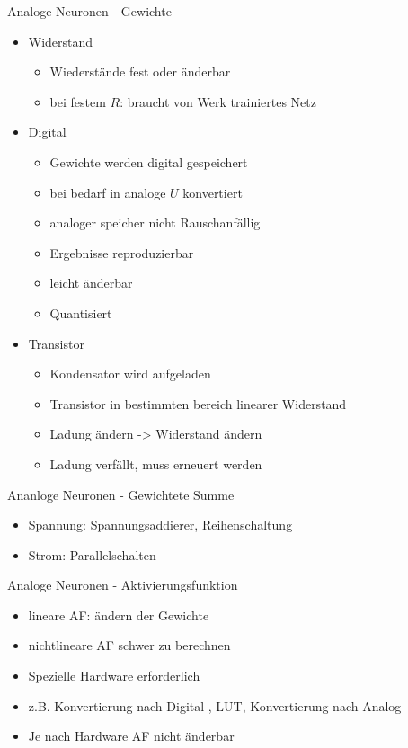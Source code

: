 \documentclass[handout]{beamer}
\begin{document}
    \begin{frame}{Analoge Neuronen - Gewichte}
        \begin{itemize}[<+->]
            \item Widerstand
            \begin{itemize}
                \item Wiederstände fest oder änderbar
                \item bei festem $R$: braucht von Werk trainiertes Netz
            \end{itemize}
            \item Digital
            \begin{itemize}
                \item Gewichte werden digital gespeichert
                \item bei bedarf in analoge $U$ konvertiert
                \item analoger speicher nicht Rauschanfällig
                \item Ergebnisse reproduzierbar
                \item leicht änderbar
                \item Quantisiert
            \end{itemize}
            \item Transistor
            \begin{itemize}
                \item Kondensator wird aufgeladen
                \item Transistor in bestimmten bereich linearer Widerstand
                \item Ladung ändern -> Widerstand ändern
                \item Ladung verfällt, muss erneuert werden
            \end{itemize}
        \end{itemize}
    \end{frame}

    \begin{frame}{Ananloge Neuronen - Gewichtete Summe}
        \begin{itemize}[<+->]
            \item Spannung: Spannungsaddierer, Reihenschaltung
            \item Strom: Parallelschalten
        \end{itemize}
    \end{frame}

    \begin{frame}{Analoge Neuronen - Aktivierungsfunktion}
        \begin{itemize}[<+->]
            \item lineare AF: ändern der Gewichte
            \item nichtlineare AF schwer zu berechnen
            \item Spezielle Hardware erforderlich
            \item z.B. Konvertierung nach Digital , LUT, Konvertierung nach Analog
            \item Je nach Hardware AF nicht änderbar
        \end{itemize}
    \end{frame}
\end{document}
